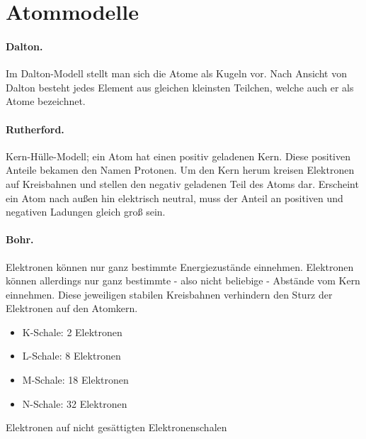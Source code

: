 \section{Atommodelle}

\paragraph{Dalton.}

Im Dalton-Modell stellt man sich die Atome als Kugeln vor. Nach Ansicht von Dalton besteht jedes Element aus gleichen kleinsten Teilchen, welche auch er als Atome bezeichnet.

\paragraph{Rutherford.}

Kern-Hülle-Modell; ein Atom hat einen positiv geladenen Kern. Diese positiven Anteile bekamen den Namen Protonen. Um den Kern herum kreisen Elektronen auf Kreisbahnen und stellen den negativ geladenen Teil des Atoms dar. Erscheint ein Atom nach außen hin elektrisch neutral, muss der Anteil an positiven und negativen Ladungen gleich groß sein.

\paragraph{Bohr.}

Elektronen können nur ganz bestimmte Energiezustände einnehmen. Elektronen können allerdings nur ganz bestimmte - also nicht beliebige - Abstände vom Kern einnehmen. Diese jeweiligen stabilen Kreisbahnen verhindern den Sturz der Elektronen auf den Atomkern.

\begin{itemize}
	\item K-Schale:  2 Elektronen
	\item L-Schale:  8 Elektronen
	\item M-Schale: 18 Elektronen
	\item N-Schale: 32 Elektronen
\end{itemize}

\begin{definition}[Valenzelektronen]
	Elektronen auf nicht gesättigten Elektronenschalen
\end{definition}